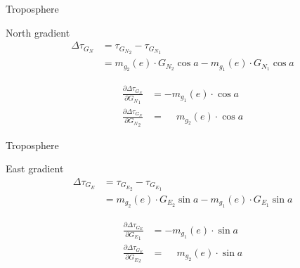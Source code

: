 \documentclass[14pt,table,t, c]{beamer}
\begin{document}
\begin{frame}{Troposphere}
\begin{block}{North gradient}
\vspace*{-\baselineskip}\setlength\belowdisplayskip{0pt}\setlength\abovedisplayskip{0pt}
\begin{align*}
\Delta\tau_{G_N} &= \tau_{{G_N}_2} - \tau_{{G_N}_1}\\
 &= m_{g_2}(e) \cdot G_{N_2}\cos a - m_{g_1}(e) \cdot G_{N_1}\cos a
\end{align*}
\end{block}
\begin{block}{\vspace*{-3ex}}
\vspace*{-\baselineskip}\setlength\belowdisplayskip{0pt}\setlength\abovedisplayskip{0pt}
\begin{align*}
\frac{\partial \Delta\tau_{G_N}}{\partial {G_N}_1} &= -m_{g_1}(e)\cdot \cos a\\ 
\frac{\partial \Delta\tau_{G_N}}{\partial {G_N}_2} &= \phantom{-}m_{g_2}(e) \cdot \cos a 
\end{align*}
\end{block}
\end{frame}

\begin{frame}{Troposphere}
\begin{block}{East gradient}
\vspace*{-\baselineskip}\setlength\belowdisplayskip{0pt}\setlength\abovedisplayskip{0pt}
\begin{align*}
\Delta\tau_{G_E} &= \tau_{{G_E}_2} - \tau_{{G_E}_1}\\
 &= m_{g_2}(e) \cdot G_{E_2}\sin a - m_{g_1}(e) \cdot G_{E_1}\sin a
\end{align*}
\end{block}
\begin{block}{\vspace*{-3ex}}
\vspace*{-\baselineskip}\setlength\belowdisplayskip{0pt}\setlength\abovedisplayskip{0pt}
\begin{align*}
\frac{\partial \Delta\tau_{G_E}}{\partial {G_E}_1} &= -m_{g_1}(e)\cdot \sin a\\ 
\frac{\partial \Delta\tau_{G_E}}{\partial {G_E}_2} &= \phantom{-}m_{g_2}(e) \cdot \sin a 
\end{align*}
\end{block}
\end{frame}
\end{document}
